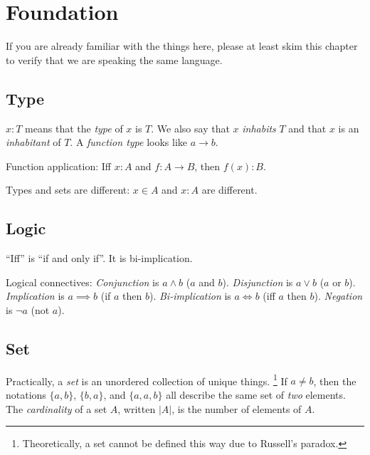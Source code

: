 \chapter{Foundation}

If you are already familiar with the things here,
please at least skim this chapter to verify that
we are speaking the same language.

\section{Type}

%
%
\(x : T\) means that the \emph{type} of \(x\) is \(T\).
We also say that \(x\) \emph{inhabits} \(T\) and that \(x\) is an \emph{inhabitant} of \(T\).
%
%
A \emph{function type} looks like \(a \to b\).

Function application:
Iff \(x:A\) and \(f:A\to B\), then \(f(x):B\).

Types and sets are different:
\(x \in A\) and \(x : A\) are different.

\section{Logic}

%
%
``Iff'' is ``if and only if''.
It is bi-implication.

%
%
Logical connectives:
%
%
\emph{Conjunction} is \(a \wedge b\) (\(a\) and \(b\)).
%
%
\emph{Disjunction} is \(a \vee b\) (\(a\) or \(b\)).
%
\emph{Implication} is \(a \implies b\) (if \(a\) then \(b\)).
%
\emph{Bi-implication} is \(a \iff b\) (iff \(a\) then \(b\)).
%
%
\emph{Negation} is \(\neg a\) (not \(a\)).

\section{Set}

%
Practically, a \emph{set} is an unordered collection of unique things.%
%
\footnote{Theoretically, a set cannot be defined this way due to Russell's paradox.}
If \(a \neq b\), then the notations \(\{a,b\}\), \(\{b,a\}\), and \(\{a,a,b\}\)
all describe the same set of \emph{two} elements.
The \emph{cardinality} of a set \(A\), written \(|A|\),
is the number of elements of \(A\).

